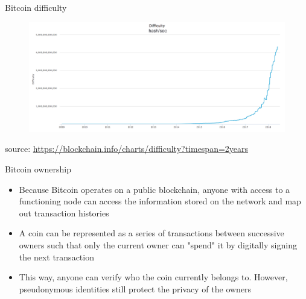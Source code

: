 \documentclass[10pt]{beamer}
\begin{document}

\begin{frame}{Bitcoin difficulty}
	\begin{figure}[]
		\centering
		\includegraphics  [scale=0.2]{Images/difficulty}
	\end{figure}
		\begin{scriptsize}
		source: \href{https://blockchain.info/charts/difficulty?timespan=2years}{https://blockchain.info/charts/difficulty?timespan=2years}
	\end{scriptsize}
\end{frame}


\begin{frame}{Bitcoin ownership}
	\begin{itemize}
		\item Because Bitcoin operates on a public blockchain, anyone with access to a functioning node can access the information stored on the network and map out transaction histories
		\item A coin can be represented as a series of transactions between successive owners such that only the current owner can "spend" it by digitally signing the next transaction
		\item This way, anyone can verify who the coin currently belongs to. However, pseudonymous identities still protect the privacy of the owners
	\end{itemize}
\end{frame}

\end{document}
